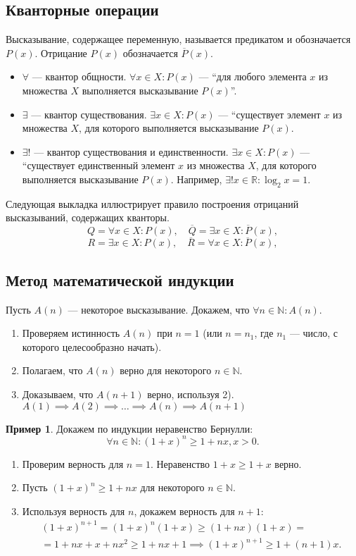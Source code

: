 \documentclass[a4paper,12pt]{article} %
\theoremstyle{remark}
\theoremstyle{definition}
\newtheorem{exmp}{Пример}[section]
\begin{document}
\subsection{Кванторные операции}

Высказывание, содержащее переменную, называется предикатом и обозначается $P(x)$.
Отрицание $P(x)$ обозначается $\overline{P}(x)$.

\begin{itemize}
	\item $\forall $ --- квантор общности. $\forall x \in X : P(x)$ --- ``для любого элемента $x$ из множества $X$ выполняется высказывание $P(x)$''.
	\item $\exists $ --- квантор существования. $\exists x \in X : P(x)$ --- ``существует элемент $x$ из множества $X$, для которого выполняется высказывание $P(x)$.
	\item $\exists !$ --- квантор существования и единственности. $\exists x \in X : P(x)$ --- ``существует единственный элемент $x$ из множества $X$, для которого выполняется высказывание $P(x)$. Например, $\exists ! x \in \mathbb{R} : \log_2 x = 1$.
\end{itemize}

Следующая выкладка иллюстрирует правило построения отрицаний высказываний, содержащих кванторы.
\[
Q = \forall x \in X : P(x), \quad \overline{Q} = \exists x \in X : \overline{P}(x)
,\] 
\[
R = \exists x \in X : P(x), \quad \overline{R} = \forall x \in X : \overline{P}(x)
,\] 
\subsection{Метод математической индукции}
Пусть $A(n)$ --- некоторое высказывание. Докажем, что $\forall n\in \mathbb{N} : A(n)$.
\begin{enumerate}
	\item Проверяем истинность $A(n)$ при $n=1$ (или $n=n_1$, где $n_1$ --- число, с которого целесообразно начать).
	\item Полагаем, что $A(n)$ верно для некоторого $n\in \mathbb{N}$.
	\item Доказываем, что $A(n+1)$ верно, используя 2). $A(1) \implies A(2) \implies \ldots \implies A(n) \implies A(n+1)$ 
\end{enumerate}

\begin{exmp}
	Докажем по индукции неравенство Бернулли:
\[
\forall n \in  \mathbb{N} : (1+x)^{n} \ge  1 + nx, x > 0
.\] 
\begin{enumerate}
	\item Проверим верность для $n = 1$. Неравенство $1 + x \ge  1 + x$ верно.
	\item Пусть $(1+x)^{n} \ge  1 + nx$ для некоторого $n \in \mathbb{N}$.
	\item Используя верность для $n$, докажем верность для $n+1$:
		\begin{multline}
		(1+x)^{n+1} = (1+x)^{n}(1+x) \ge (1+nx)(1+x) = \\
		= 1 + nx + x + nx^2 \ge 1 + nx + 1 \implies (1+x)^{n+1} \ge  1 + (n+1)x. 	
		\end{multline}
\end{enumerate}

\end{exmp}
\newpage
\end{document}
